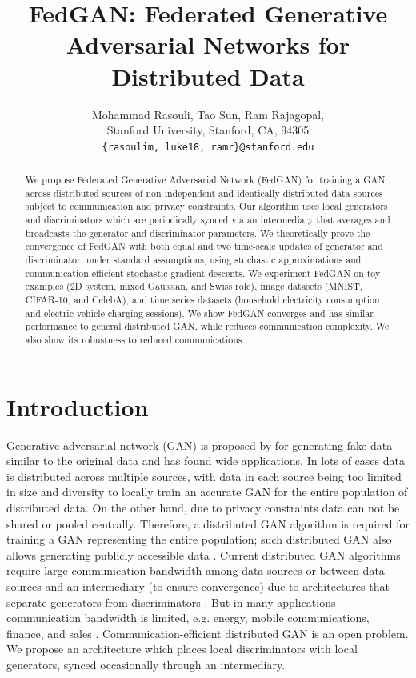 \documentclass{article}
\title{FedGAN: Federated Generative Adversarial Networks for Distributed Data}
\author{%
  Mohammad Rasouli, Tao Sun, Ram Rajagopal, \\
  Stanford University, Stanford, CA,  94305 \\
  \texttt{\{rasoulim, luke18, ramr\}@stanford.edu} \\
}
\begin{document}
\maketitle

\begin{abstract}
  We propose Federated Generative Adversarial Network (FedGAN) for training a GAN across distributed sources of non-independent-and-identically-distributed data sources subject to communication and privacy constraints. Our algorithm uses local generators and discriminators which are periodically synced via an intermediary that averages and broadcasts the generator and discriminator parameters. We theoretically prove the convergence of FedGAN with both equal and two time-scale updates of generator and discriminator, under standard assumptions, using stochastic approximations and communication efficient stochastic gradient descents. We experiment FedGAN on toy examples (2D system, mixed Gaussian, and Swiss role), image datasets (MNIST, CIFAR-10, and CelebA), and time series datasets (household electricity consumption and electric vehicle charging sessions). We show FedGAN converges and has similar performance to general distributed GAN, while reduces communication complexity. We also show its robustness to reduced communications.
\end{abstract}

\section{Introduction}
\label{intro}
Generative adversarial network (GAN) is proposed by \citep{goodfellow2014generative} for generating fake data similar to the original data and has found wide applications. In lots of cases data is distributed across multiple sources, with data in each source being too limited in size and diversity to locally train an accurate GAN for the entire population of distributed data. On the other hand, due to privacy constraints data can not be shared or pooled centrally. Therefore, a distributed GAN algorithm is required for training a GAN representing the entire population; such distributed GAN also allows generating publicly accessible data \citep{yonetani2019decentralized}. Current distributed GAN algorithms require large communication bandwidth among data sources or between data sources and an intermediary (to ensure convergence) due to architectures that separate generators from discriminators \citep{augenstein2019generative,hardy2018md}. But in many applications communication bandwidth is limited, e.g. energy, mobile communications, finance, and sales \citep{yang2019federated}. 
Communication-efficient distributed GAN is an open problem. We propose an architecture which places local discriminators with local generators, synced occasionally through an intermediary.
\end{document}
